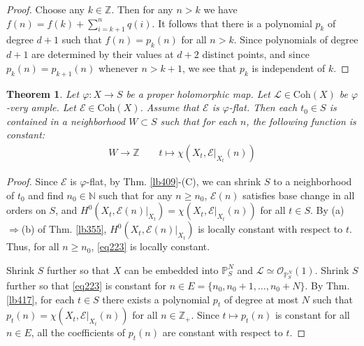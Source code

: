 \documentclass[12pt,b5paper,notitlepage]{report}
\theoremstyle{definition}
\theoremstyle{plain}
\newtheorem{thm}[df]{Theorem}
\newcommand{\scr}{\mathscr}
\newcommand{\Nbb}{\mathbb N}
\newcommand{\Zbb}{\mathbb Z}
\newcommand{\Pbb}{\mathbb P}
\newcommand{\Coh}{\mathrm{Coh}}
\numberwithin{equation}{section}
\begin{document}
\begin{proof}
Choose any $k\in\Zbb$. Then for any $n> k$ we have $f(n)=f(k)+\sum_{i=k+1}^nq(i)$. It follows that there is a polynomial $p_k$ of degree $d+1$ such that $f(n)=p_k(n)$ for all $n>k$. Since polynomials of degree $d+1$ are determined by their values at $d+2$ distinct points, and since $p_k(n)=p_{k+1}(n)$ whenever $n>k+1$, we see that $p_k$ is independent of $k$.
\end{proof}



\begin{thm}\label{lb418}
Let $\varphi:X\rightarrow S$ be a proper holomorphic map. Let $\scr L\in\Coh(X)$ be $\varphi$-very ample. Let $\scr E\in\Coh(X)$. Assume that $\scr E$ is $\varphi$-flat. Then each $t_0\in S$ is contained in a neighborhood $W\subset S$ such that for each $n$, the following function is constant:
\begin{align}
W\rightarrow \Zbb\qquad t\mapsto\chi(X_t,\scr E|_{X_t}(n))  \label{eq223}
\end{align}
\end{thm}



\begin{proof}
Since $\scr E$ is $\varphi$-flat, by Thm. \ref{lb409}-(C), we can shrink $S$ to a neighborhood of $t_0$ and find $n_0\in\Nbb$ such that for any $n\geq n_0$, $\scr E(n)$ satisfies base change in all orders on $S$, and $H^0(X_t,\scr E(n)|_{X_t})=\chi(X_t,\scr E|_{X_t}(n))$ for all $t\in S$. By (a)$\Rightarrow$(b) of Thm. \ref{lb355}, $H^0(X_t,\scr E(n)|_{X_t})$ is locally constant with respect to $t$. Thus, for all $n\geq n_0$, \eqref{eq223} is locally constant.

Shrink $S$ further so that $X$ can be embedded into $\Pbb^N_S$ and $\scr L\simeq\scr O_{\Pbb^N_S}(1)$. Shrink $S$ further so that \eqref{eq223} is constant for $n\in E=\{n_0,n_0+1,\dots,n_0+N\}$. By Thm. \ref{lb417}, for each $t\in S$ there exists a polynomial $p_t$ of degree at most $N$ such that $p_t(n)=\chi(X_t,\scr E|_{X_t}(n))$ for all $n\in\Zbb_+$. Since $t\mapsto p_t(n)$ is constant for all $n\in E$, all the coefficients of $p_t(n)$ are constant with respect to $t$.
\end{proof}
\end{document}
